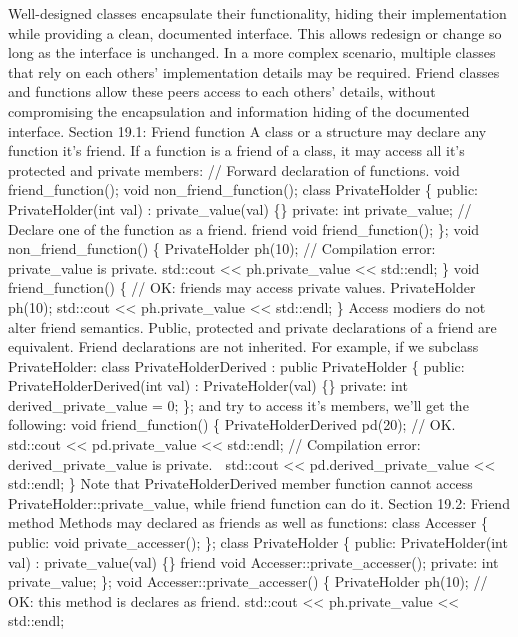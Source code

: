 Well-designed classes encapsulate their functionality, hiding their
implementation while providing a clean, documented interface. This
allows redesign or change so long as the interface is unchanged. In a
more complex scenario, multiple classes that rely on each others'
implementation details may be required. Friend classes and functions
allow these peers access to each others' details, without compromising
the encapsulation and information hiding of the documented interface.
Section 19.1: Friend function A class or a structure may declare any
function it's friend. If a function is a friend of a class, it may
access all it's protected and private members: // Forward declaration of
functions. void friend\_function(); void non\_friend\_function(); class
PrivateHolder \{ public: PrivateHolder(int val) : private\_value(val)
\{\} private: int private\_value; // Declare one of the function as a
friend. friend void friend\_function(); \}; void non\_friend\_function()
\{ PrivateHolder ph(10); // Compilation error: private\_value is
private. std::cout \textless\textless{} ph.private\_value
\textless\textless{} std::endl; \} void friend\_function() \{ // OK:
friends may access private values. PrivateHolder ph(10); std::cout
\textless\textless{} ph.private\_value \textless\textless{} std::endl;
\} Access modiers do not alter friend semantics. Public, protected and
private declarations of a friend are equivalent. Friend declarations are
not inherited. For example, if we subclass PrivateHolder: class
PrivateHolderDerived : public PrivateHolder \{ public:
PrivateHolderDerived(int val) : PrivateHolder(val) \{\} private: int
derived\_private\_value = 0; \}; and try to access it's members, we'll
get the following: void friend\_function() \{ PrivateHolderDerived
pd(20); // OK. std::cout \textless\textless{} pd.private\_value
\textless\textless{} std::endl; // Compilation error:
derived\_private\_value is private.  std::cout \textless\textless{}
pd.derived\_private\_value \textless\textless{} std::endl; \} Note that
PrivateHolderDerived member function cannot access
PrivateHolder::private\_value, while friend function can do it. Section
19.2: Friend method Methods may declared as friends as well as
functions: class Accesser \{ public: void private\_accesser(); \}; class
PrivateHolder \{ public: PrivateHolder(int val) : private\_value(val)
\{\} friend void Accesser::private\_accesser(); private: int
private\_value; \}; void Accesser::private\_accesser() \{ PrivateHolder
ph(10); // OK: this method is declares as friend. std::cout
\textless\textless{} ph.private\_value \textless\textless{} std::endl;

